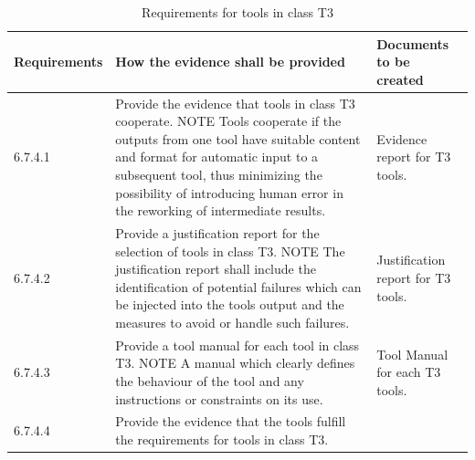 \documentclass{template/openetcs_report}
\begin{document}
{\footnotesize\sffamily\centering
\begin{longtable}{|p{2cm}|p{9cm}|p{3cm}|}
\caption{Requirements for tools in class T3}\\
\hline
\bfseries Requirements & \bfseries How the evidence shall be provided & \bfseries Documents to be created\\
\hline
\hline
\endhead
\hline
\endfoot

6.7.4.1 & Provide the evidence that tools in class T3 cooperate. 
\linebreak
\linebreak 
NOTE \linebreak
Tools cooperate if the outputs from one tool have suitable content and format for automatic input to a subsequent tool, thus minimizing the possibility of introducing human error in the reworking of intermediate results. & Evidence report for T3 tools.\\ 
\hline
6.7.4.2 & Provide a justification report for the selection of tools in class T3.
\linebreak
\linebreak 
NOTE \linebreak
The justification report shall include the identification of potential failures which can be injected into the tools output and the measures to avoid or handle such failures. & Justification report for T3 tools.\\ 
\hline
6.7.4.3 & Provide a tool manual for each tool in class T3.
\linebreak
\linebreak
NOTE \linebreak
A manual which clearly defines the behaviour of the tool and any instructions or constraints on its use. & Tool Manual for each T3 tools.\\ 
\hline
6.7.4.4 & Provide the evidence that the tools fulfill the requirements for tools in class T3.


\end{longtable}}
\end{document}
